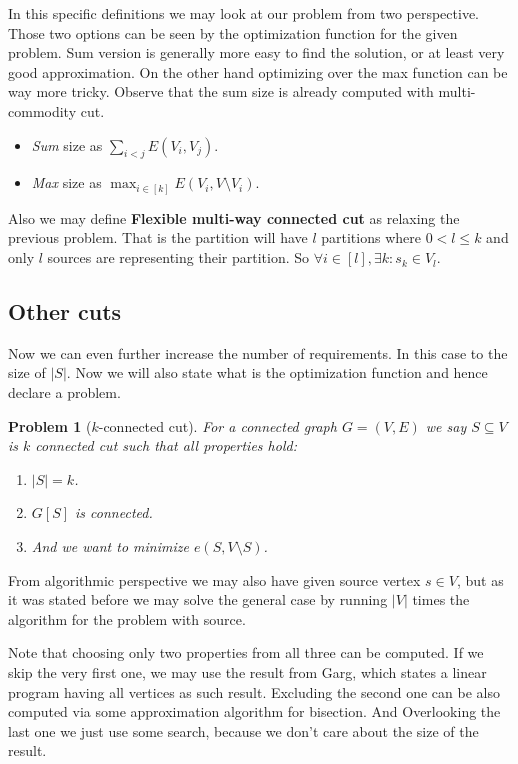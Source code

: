 \documentclass{article}
\theoremstyle{plain}
\theoremstyle{plain}
\newtheorem{problem}{Problem}
\theoremstyle{remark}
\begin{document}
	In this specific definitions we may look at our problem from two perspective. Those two options can be seen by the optimization function for the given problem. Sum version is generally more easy to find the solution, or at least very good approximation. On the other hand optimizing over the max function can be way more tricky. Observe that the sum size is already computed with multi-commodity cut.
	
	\begin{itemize}
		\item \textit{Sum} size as $\sum_{i < j} E(V_i, V_j)$.
		\item \textit{Max} size as $\max_{i \in[k]} E(V_i, V \setminus V_i)$.
	\end{itemize}
	
	 Also we may define \textbf{Flexible multi-way connected cut} as relaxing the previous problem. That is the partition will have $l$ partitions where $0 < l \leq k$ and only $l$ sources are representing their partition. So $\forall i \in [l] , \exists k : s_k \in V_l$.
	
	\subsection{Other cuts}
	
	Now we can even further increase the number of requirements. In this case to the size of $|S|$. Now we will also state what is the optimization function and hence declare a problem.
	
	\begin{problem}[$k$-connected cut]
		For a connected graph $G = (V,E)$ we say $S \subseteq V$ is $k$ connected cut such that all properties hold:
		
		\begin{enumerate}
			\item $|S| = k$.
			\item $G[S]$ is connected.
			\item And we want to minimize $e(S, V \setminus S)$.
		\end{enumerate}
	\end{problem}

	From algorithmic perspective we may also have given source vertex $s \in V$, but as it was stated before we may solve the general case by running $|V|$ times the algorithm for the problem with source.
	
	Note that choosing only two properties from all three can be computed. If we skip the very first one, we may use the result from Garg, which states a linear program having all vertices as such result. Excluding the second one can be also computed via some approximation algorithm for bisection. And Overlooking the last one we just use some search, because we don't care about the size of the result.
	
\end{document}
